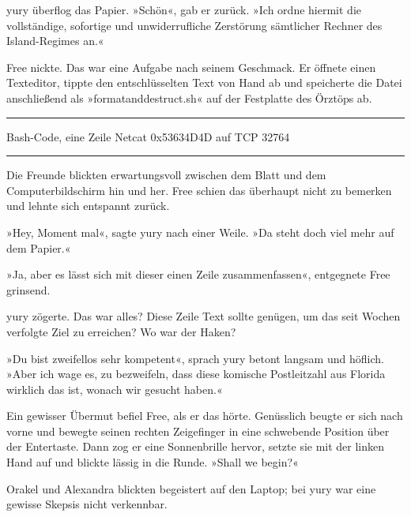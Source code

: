 yury überflog das Papier. »Schön«, gab er zurück. »Ich ordne hiermit die vollständige, sofortige und unwiderrufliche Zerstörung sämtlicher Rechner des Island-Regimes an.«

Free nickte. Das war eine Aufgabe nach seinem Geschmack. Er öffnete einen Texteditor, tippte den entschlüsselten Text von Hand ab und speicherte die Datei anschließend als »formatanddestruct.sh« auf der Festplatte des Örztöps ab.

\noindent \parbox{\textwidth}{ \vspace{3ex} \hrule \vspace{3ex}

    \begin{tiny}
    \begin{ttfamily}

\noindent Bash-Code, eine Zeile Netcat 0x53634D4D auf TCP 32764

    \end{ttfamily}
    \end{tiny}

\vspace{3ex} \hrule \vspace{3ex} }

Die Freunde blickten erwartungsvoll zwischen dem Blatt und dem Computerbildschirm hin und her. Free schien das überhaupt nicht zu bemerken und lehnte sich entspannt zurück.

»Hey, Moment mal«, sagte yury nach einer Weile. »Da steht doch viel mehr auf dem Papier.«

»Ja, aber es lässt sich mit dieser einen Zeile zusammenfassen«, entgegnete Free grinsend.

yury zögerte. Das war alles? Diese Zeile Text sollte genügen, um das seit Wochen verfolgte Ziel zu erreichen? Wo war der Haken?

»Du bist zweifellos sehr kompetent«, sprach yury betont langsam und höflich. »Aber ich wage es, zu bezweifeln, dass diese komische Postleitzahl aus Florida wirklich das ist, wonach wir gesucht haben.«

Ein gewisser Übermut befiel Free, als er das hörte. Genüsslich beugte er sich nach vorne und bewegte seinen rechten Zeigefinger in eine schwebende Position über der Entertaste. Dann zog er eine Sonnenbrille hervor, setzte sie mit der linken Hand auf und blickte lässig in die Runde. »Shall we begin?«

Orakel und Alexandra blickten begeistert auf den Laptop; bei yury war eine gewisse Skepsis nicht verkennbar.


